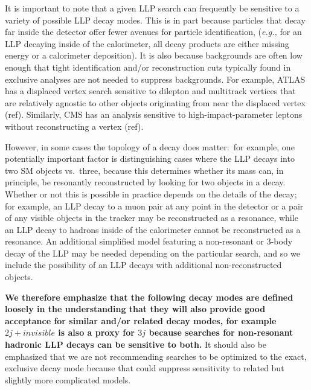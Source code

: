 It is important to note that a given LLP search can frequently be
sensitive to a variety of possible LLP decay modes.  This is in part
because particles that decay far inside the detector offer fewer
avenues for particle identification, (\emph{e.g.,} for an LLP decaying
inside of the calorimeter, all decay products are either missing
energy or a calorimeter deposition). It is also because backgrounds
are often low enough that tight identification and/or reconstruction
cuts typically found in exclusive analyses are not needed to suppress
backgrounds. For example, ATLAS has a displaced vertex search
sensitive to dilepton and multitrack vertices that are relatively
agnostic to other objects originating from near the displaced vertex
(ref). Similarly, CMS has an analysis sensitive to
high-impact-parameter leptons without reconstructing a vertex
(ref). 

However, in some cases the topology of a decay does matter:~for
example, one potentially important factor is distinguishing cases
where the LLP decays into two SM objects vs.~three, because this
determines whether its mass can, in principle, be resonantly reconstructed by looking
for two objects in a decay.   Whether or not this is possible in practice depends on the details
  of the decay; for example, an LLP decay to a muon pair at any point in the detector
   or a pair of any visible objects in the tracker
  may be reconstructed as a resonance, while an LLP decay to hadrons inside of the calorimeter
  cannot be reconstructed as a resonance. An additional simplified model 
  featuring a non-resonant or 3-body decay of the LLP may be needed depending on the particular
  search, and so we include the possibility of an LLP decays with additional non-reconstructed objects. 

{\bf We therefore emphasize that the following decay modes are defined
  loosely in the understanding that they will also provide good
  acceptance for similar and/or related decay modes, for example
  $2j+invisible$ is also a proxy for $3j$ because searches for
  non-resonant hadronic LLP decays can be sensitive to both.} It
should also be emphasized that we are not recommending searches to be
optimized to the exact, exclusive decay mode because that could
suppress sensitivity to related but slightly more complicated models.

